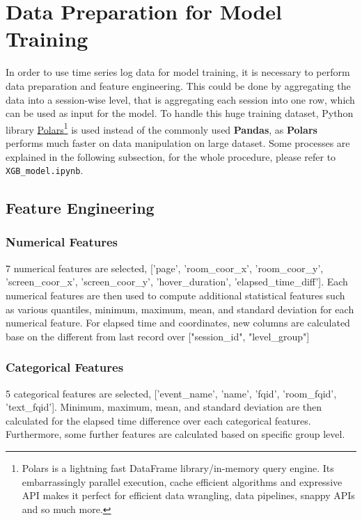 \documentclass[11pt,a4paper]{article}
\begin{document}
    \section{Data Preparation for Model Training}
    In order to use time series log data for model training, it is necessary to perform data preparation and feature engineering. This could be done by aggregating the data into a session-wise level, that is aggregating each session into one row, which can be used as input for the model. To handle this huge training dataset, Python library \href{https://www.pola.rs/}{Polars}\footnote{Polars is a lightning fast DataFrame library/in-memory query engine. Its embarrassingly parallel execution, cache efficient algorithms and expressive API makes it perfect for efficient data wrangling, data pipelines, snappy APIs and so much more.} \cite{polars} is used instead of the commonly used \textbf{Pandas}, as \textbf{Polars} performs much faster on data manipulation on large dataset. Some processes are explained in the following subsection, for the whole procedure, please refer to \texttt{XGB\_model.ipynb}.

    \subsection{Feature Engineering}
    \subsubsection{Numerical Features}
    7 numerical features are selected, ['page', 'room\_coor\_x', 'room\_coor\_y', 'screen\_coor\_x', 'screen\_coor\_y', 'hover\_duration', 'elapsed\_time\_diff']. Each numerical features are then used to compute additional statistical features such as various quantiles, minimum, maximum, mean, and standard deviation for each numerical feature. For elapsed time and coordinates, new columns are calculated base on the different from last record over ["session\_id", "level\_group"]

    \subsubsection{Categorical Features}
    5 categorical features are selected, ['event\_name', 'name', 'fqid', 'room\_fqid', 'text\_fqid']. Minimum, maximum, mean, and standard deviation are then calculated for the elapsed time difference over each categorical features. Furthermore, some further features are calculated based on specific group level.
    
\end{document}
